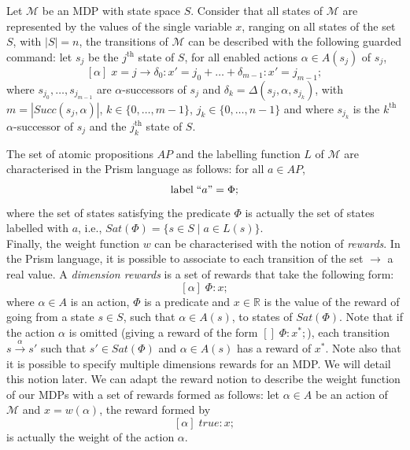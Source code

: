 \begin{example}
Let $\mathcal{M}$ be an MDP with state space $S$. Consider that all states of $\mathcal{M}$ are represented by the values of the single variable $x$, ranging on all states of the set $S$, with $|S|=n$, the transitions of $\mathcal{M}$ can be described with the following guarded command:
let $s_j$ be the $j^{\text{th}}$ state of $S$, for all enabled actions $\alpha \in A(s_j)$ of $s_j$,
\[
  [\alpha] \; x=j \rightarrow \delta_0: x'=j_0 + \dots + \delta_{m-1}:  x'=j_{m-1};
\]
where $s_{j_0}, \dots, s_{j_{m-1}}$ are $\alpha$-successors of $s_j$ and $\delta_k = \Delta(s_j, \alpha, s_{j_k})$,
with  $m=|Succ(s_j,\alpha)|$, $k \in \{0, \dots, m-1\}$, $j_k \in \{0, \dots, n-1\}$ and where $s_{j_k}$ is the $k^\text{th}$ $\alpha$-successor of $s_j$ and the $j_k^\text{th}$ state of $S$.
\end{example}

The set of atomic propositions $AP$ and the labelling function $L$ of $\mathcal{M}$ are characterised in the Prism language as follows: for all $a \in AP$,
\[
  \text{label} \; ``a" = \Phi;
\]
where the set of states satisfying the predicate $\Phi$ is actually the set of states labelled with $a$, i.e., $Sat(\Phi) = \{ s \in S \; | \; a \in L(s) \}$. \\

%

Finally, the weight function $w$ can be characterised with the notion of \textit{rewards}. In the Prism language, it is possible to associate to each transition
of the set %
$\rightarrow$
a real value. A \textit{dimension rewards} is a set of rewards that take the following form:
\[
  [\alpha] \; \Phi: x;
\]
where $\alpha \in A$ is an action, $\Phi$ is a predicate and $x \in \mathbb{R}$
is the value of the reward of going from a state $s \in S$, such that $\alpha \in A(s)$, to states of $Sat(\Phi)$. Note that if the action $\alpha$ is omitted (giving a reward of the form $[]\; \Phi: x^*;$), each transition $s \xrightarrow{\,\alpha\,} s'$ such that $s' \in Sat(\Phi)$ and $\alpha \in A(s)$
has a reward of $x^*$. Note also that it is possible to specify multiple dimensions rewards for an MDP. We will detail this notion later.
We can adapt the reward notion to describe the weight function of our MDPs with a set of rewards formed as follows:
let $\alpha \in A$ be an action of $\mathcal{M}$ and $x = w(\alpha)$, the reward formed by
\[
  [\alpha] \; true: x;
\]
is actually the weight of the action $\alpha$.

